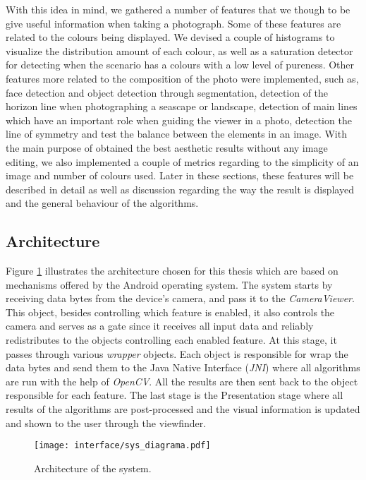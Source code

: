 With this idea in mind, we gathered a number of features that we though to be give useful information when taking a photograph. Some of these features are related to the colours being displayed. We devised a couple of histograms to visualize the distribution amount of each colour, as well as a saturation detector for detecting when the scenario has a colours with a low level of pureness. Other features more related to the composition of the photo were implemented, such as, face detection and object detection through segmentation, detection of the horizon line when photographing a seascape or landscape, detection of main lines which have an important role when guiding the viewer in a photo, detection the line of symmetry and test the balance between the elements in an image. With the main purpose of obtained the best aesthetic results without any image editing, we also implemented a couple of metrics regarding to the simplicity of an image and number of colours used. Later in these sections, these features will be described in detail as well as discussion regarding the way the result is displayed and the general behaviour of the algorithms.

\subsection{Architecture}

Figure \ref{fig:sys_diagram} illustrates the architecture chosen for this thesis which are based on mechanisms offered by the Android operating system. The system starts by receiving data bytes from the device's camera, and pass it to the \emph{CameraViewer}. This object, besides controlling which feature is enabled, it also controls the camera and serves as a gate since it receives all input data and reliably redistributes to the objects controlling each enabled feature. 
At this stage, it passes through various \emph{wrapper} objects. Each object is responsible for wrap the data bytes and send them to the Java Native Interface (\emph{JNI}) where all algorithms are run with the help of \emph{OpenCV}. All the results are then sent back to the object responsible for each feature. The last stage is the Presentation stage where all results of the algorithms are post-processed and the visual information is updated and shown to the user through the viewfinder.

\begin{figure}[htb]
	\centering
	\texttt{[image: interface/sys\_diagrama.pdf]}
	\caption{Architecture of the system.}
	\label{fig:sys_diagram}
\end{figure}

